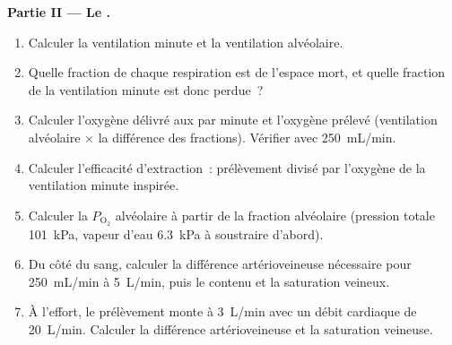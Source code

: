 \begin{problem}
\medskip
\noindent\textbf{Partie II --- Le .}
\begin{enumerate}[resume]
  \item Calculer la ventilation minute et la ventilation alvéolaire.
  \item Quelle fraction de chaque respiration est de l'espace mort, et
        quelle fraction de la ventilation minute est donc perdue~?
  \item Calculer l'oxygène délivré aux  par minute et
        l'oxygène prélevé (ventilation alvéolaire $\times$ la
        différence des fractions). Vérifier avec \qty{250}{mL/min}.
  \item Calculer l'efficacité d'extraction~: prélèvement divisé par
        l'oxygène de la ventilation minute inspirée.
  \item Calculer la $P_{\mathrm{O_2}}$ alvéolaire à partir de la
        fraction alvéolaire (pression totale \qty{101}{kPa}, vapeur
        d'eau \qty{6.3}{kPa} à soustraire d'abord).
  \item Du côté du sang, calculer la différence artérioveineuse
        nécessaire pour \qty{250}{mL/min} à \qty{5}{L/min}, puis le
        contenu et la saturation veineux.
  \item À l'effort, le prélèvement monte à \qty{3}{L/min} avec un
        débit cardiaque de \qty{20}{L/min}. Calculer la différence
        artérioveineuse et la saturation veineuse.
\end{enumerate}


\end{problem}
